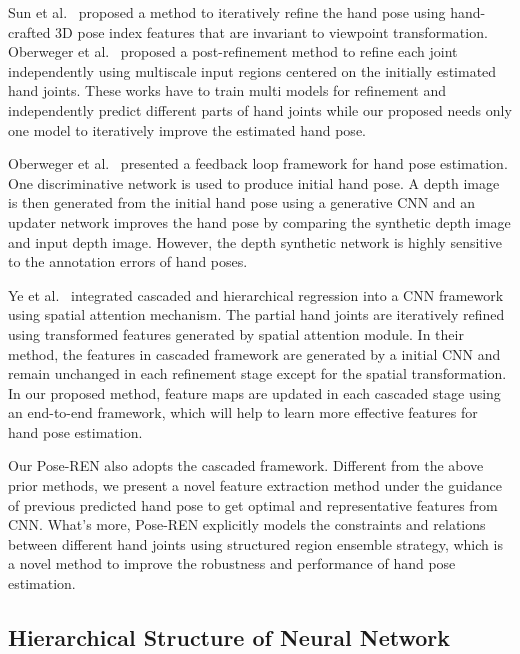 \documentclass[final, 5p]{elsarticle}
\begin{document}
Sun et al.~\cite{sun2015cascaded} proposed a method to iteratively refine the hand pose using hand-crafted 3D pose index features that are invariant to viewpoint transformation. Oberweger et al.~\cite{oberweger2015hands} proposed a post-refinement method to refine each joint independently using multiscale input regions centered on the initially estimated hand joints. These works have to train multi models for refinement and independently predict different parts of hand joints while our proposed needs only one model to iteratively improve the estimated hand pose.

Oberweger et al.~\cite{oberweger2015training} presented a feedback loop framework for hand pose estimation. One discriminative network is used to produce initial hand pose. A depth image is then generated from the initial hand pose using a generative CNN and an updater network improves the hand pose by comparing the synthetic depth image and input depth image. However, the depth synthetic network is highly sensitive to the annotation errors of hand poses.

Ye et al.~\cite{YeSpatialHandECCV2016} integrated cascaded and hierarchical regression into a CNN framework using spatial attention mechanism. The partial hand joints are iteratively refined using transformed features generated by spatial attention module. In their method, the features in cascaded framework are generated by a initial CNN and remain unchanged in each refinement stage except for the spatial transformation. In our proposed method, feature maps are updated in each cascaded stage using an end-to-end framework, which will help to learn more effective features for hand pose estimation.

Our Pose-REN also adopts the cascaded framework. Different from the above prior methods, we present a novel feature extraction method under the guidance of previous predicted hand pose to get optimal and representative features from CNN. What's more, Pose-REN explicitly models the constraints and relations between different hand joints using structured region ensemble strategy, which is a novel method to improve the robustness and performance of hand pose estimation.

\subsection{Hierarchical Structure of Neural Network}
\end{document}
